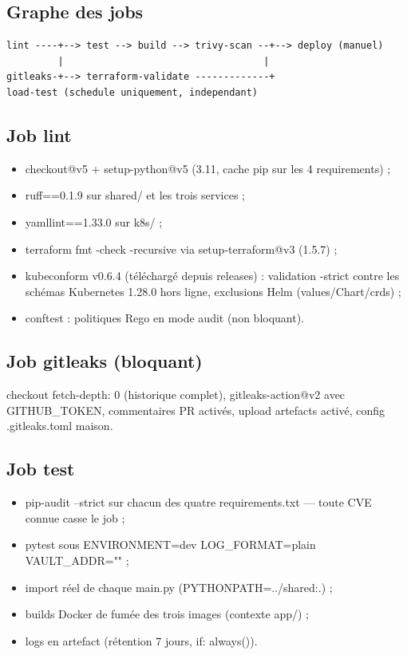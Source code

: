 \documentclass[12pt,a4paper]{article}
\begin{document}
\subsection{Graphe des jobs}
\begin{lstlisting}[caption={Ordre et dépendances des jobs}]
lint ----+--> test --> build --> trivy-scan --+--> deploy (manuel)
         |                                   |
gitleaks-+--> terraform-validate -------------+
load-test (schedule uniquement, independant)
\end{lstlisting}

\subsection{Job lint}
\begin{itemize}[itemsep=1pt]
  \item checkout@v5 + setup-python@v5 (3.11, cache pip sur les 4 requirements) ;
  \item ruff==0.1.9 sur shared/ et les trois services ;
  \item yamllint==1.33.0 sur k8s/ ;
  \item terraform fmt -check -recursive via setup-terraform@v3 (1.5.7) ;
  \item kubeconform v0.6.4 (téléchargé depuis releases) : validation -strict contre les schémas Kubernetes 1.28.0 hors ligne, exclusions Helm (values/Chart/crds) ;
  \item conftest : politiques Rego en mode audit (non bloquant).
\end{itemize}

\subsection{Job gitleaks (bloquant)}
checkout fetch-depth: 0 (historique complet), gitleaks-action@v2 avec GITHUB\_TOKEN, commentaires PR activés, upload artefacts activé, config .gitleaks.toml maison.

\subsection{Job test}
\begin{itemize}[itemsep=1pt]
  \item pip-audit --strict sur chacun des quatre requirements.txt --- toute CVE connue casse le job ;
  \item pytest sous ENVIRONMENT=dev LOG\_FORMAT=plain VAULT\_ADDR="" ;
  \item import réel de chaque main.py (PYTHONPATH=../shared:.) ;
  \item builds Docker de fumée des trois images (contexte app/) ;
  \item logs en artefact (rétention 7 jours, if: always()).
\end{itemize}
\end{document}
